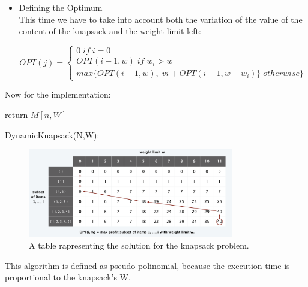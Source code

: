 \documentclass[11pt]{article}
\begin{document}
\begin{itemize}

\item {Defining the Optimum}\\

This time we have to take into account both the variation of the value of the content of the knapsack and the weight limit left:

\[OPT(j) = \begin{cases} 0 \; if \; i = 0 \\ OPT(i-1,w) \; if \; w_{i} > w \\ max\{OPT(i−1,w),\; vi + OPT(i−1,w−w_{i})\} \; otherwise \}  \end{cases}\]

\end{itemize}

Now for the implementation:

\begin{algorithm}[H]
\SetAlgoLined
\small
{}
\BlankLine

\BlankLine



\BlankLine
return $M[n,W]$

\caption{DynamicKnapsack(N,W):}
\end{algorithm}

\begin{figure}[H]
		\centering
		\includegraphics[width=0.8\textwidth ]{knapsack2}
		\caption{A table rapresenting the solution for the knapsack problem.}
\end{figure}

This algorithm is defined as pseudo-polinomial, because the execution time is proportional to the knapsack's W.\\
\end{document}
